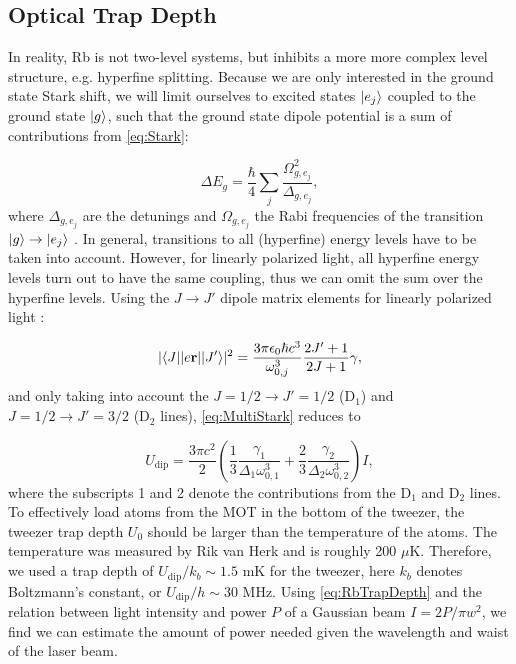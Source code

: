 \subsection{Optical Trap Depth}

In reality, Rb is not two-level systems, but inhibits a more more complex level structure, e.g. hyperfine splitting.
Because we are only interested in the ground state Stark shift, we will limit ourselves to excited states $\lvert e_j\rangle$ coupled to the ground state $\lvert g\rangle$, such that the ground state dipole potential is a sum of contributions from \cref{eq:Stark}:

\begin{equation}\label{eq:MultiStark}
    \Delta E_{g} = \frac{\hbar}{4} \sum_j \frac{\Omega_{g,e_j}^2}{\Delta_{g,e_j}},
\end{equation}
where $\Delta_{g,e_j}$ are the detunings and $\Omega_{g,e_j}$ the Rabi frequencies of the transition $\lvert g\rangle \rightarrow \lvert e_j\rangle$ \cite{Brossard2020}. 
In general, transitions to all (hyperfine) energy levels have to be taken into account. 
However, for linearly polarized light, all hyperfine energy levels turn out to have the same coupling, thus we can omit the sum over the hyperfine levels. Using the $J \rightarrow J'$ dipole matrix elements for linearly polarized light \cite{Steck2008}:

\begin{equation}
    |\langle J\rvert | e \mathbf{r} | \lvert J'\rangle|^2 = \frac{3 \pi \epsilon_0 \hbar c^3}{\omega_{0,j}^3} \frac{2J'+1}{2J+1} \gamma,
\end{equation}
and only taking into account the $J=1/2 \rightarrow J'=1/2$ (D$_1$) and $J=1/2 \rightarrow J'=3/2$ (D$_2$ lines), \cref{eq:MultiStark} reduces to

\begin{equation}\label{eq:RbTrapDepth}
    U_{\text{dip}} = \frac{3\pi c^2}{2} \left(
    \frac{1}{3}\frac{\gamma_1}{\Delta_1 \omega_{0,1}^3} + \frac{2}{3}\frac{ \gamma_2}{\Delta_2 \omega_{0,2}^3} 
    \right) I,
\end{equation}
where the subscripts 1 and 2 denote the contributions from the D$_1$ and D$_2$ lines. 
To effectively load atoms from the MOT in the bottom of the tweezer, the tweezer trap depth $U_0$ should be larger than the temperature of the atoms. 
The temperature was measured by Rik van Herk \cite{Herk2022} and is roughly 200 $\mu$K.
Therefore, we used a trap depth of $U_{\text{dip}} /k_b \sim 1.5$ mK for the tweezer, here $k_b$ denotes Boltzmann's constant, or $U_{\text{dip}} / h \sim 30$ MHz.
Using \cref{eq:RbTrapDepth} and the relation between light intensity and power $P$ of a Gaussian beam $I = 2P/\pi w^2$, we find we can estimate the amount of power needed given the wavelength and waist of the laser beam. 


